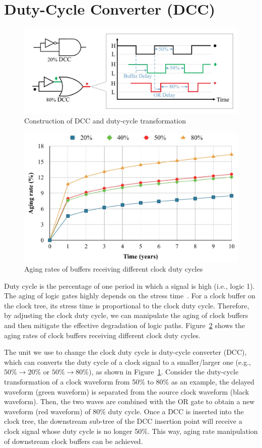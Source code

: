 \section{Duty-Cycle Converter (DCC)}
\begin{figure}
    \centering
    \includegraphics[width=1\columnwidth]{images/dcc.png} %
    \caption{Construction of DCC and duty-cycle transformation}
    \label{fig:dcc}
\end{figure}
\begin{figure}
    \centering
    \includegraphics[width=0.85\columnwidth]{images/agr.png} %
    \caption{Aging rates of buffers receiving different clock duty cycles}
    \label{fig:agr}
\end{figure}

Duty cycle is the percentage of one period in which a signal is high (i.e., logic 1). The aging of logic gates highly depends on the stress time~\cite{wang2010impact}. For a clock buffer on the clock tree, its stress time is proportional to the clock duty cycle. Therefore, by adjusting the clock duty cycle, we can manipulate the aging of clock buffers and then mitigate the effective degradation of logic paths. Figure~\ref{fig:agr} shows the aging rates of clock buffers receiving different clock duty cycles. 

The unit we use to change the clock duty cycle is duty-cycle converter (DCC), which can converts the duty cycle of a clock signal to a smaller/larger one (e.g., $50\% \rightarrow 20\%$ or $50\% \rightarrow 80\%$), as shown in Figure~\ref{fig:dcc}. Consider the duty-cycle transformation of a clock waveform from 50\% to 80\% as an example, the delayed waveform (green waveform) is separated from the source clock waveform (black waveform). Then, the two waves are combined with the OR gate to obtain a new waveform (red waveform) of 80\% duty cycle. Once a DCC is inserted into the clock tree, the downstream sub-tree of the DCC insertion point will receive a clock signal whose duty cycle is no longer 50\%. This way, aging rate manipulation of downstream clock buffers can be achieved.



